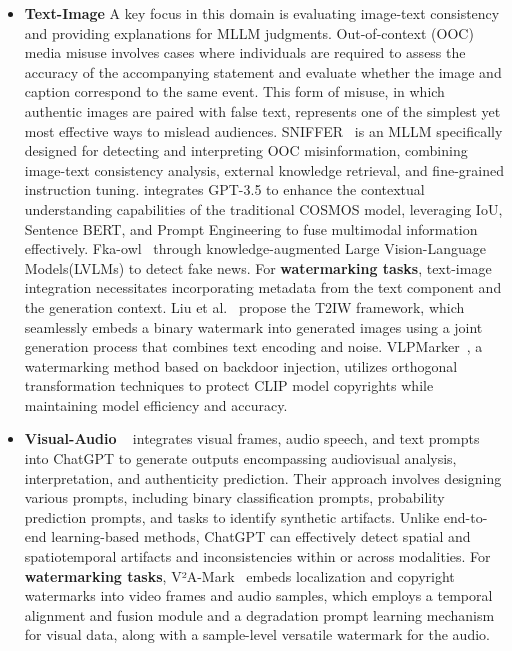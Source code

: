\begin{itemize}
    \item \textbf{Text-Image}
    A key focus in this domain is evaluating image-text consistency and providing explanations for MLLM judgments. Out-of-context (OOC) media misuse involves cases where individuals are required to assess the accuracy of the accompanying statement and evaluate whether the image and caption correspond to the same event. This form of misuse, in which authentic images are paired with false text, represents one of the simplest yet most effective ways to mislead audiences. SNIFFER~\cite{qi2024sniffer} is an MLLM specifically designed for detecting and interpreting OOC misinformation, combining image-text consistency analysis, external knowledge retrieval, and fine-grained instruction tuning. \cite{wu2023cheap} integrates GPT-3.5 to enhance the contextual understanding capabilities of the traditional COSMOS model, leveraging IoU, Sentence BERT, and Prompt Engineering to fuse multimodal information effectively. Fka-owl~\cite{liu2024fka} through knowledge-augmented Large Vision-Language Models(LVLMs) to detect fake news.
    For \textbf{watermarking tasks}, text-image integration necessitates incorporating metadata from the text component and the generation context. Liu et al.~\cite{liu2023t2iw} propose the T2IW framework, which seamlessly embeds a binary watermark into generated images using a joint generation process that combines text encoding and noise. VLPMarker~\cite{tang2023watermarking}, a watermarking method based on backdoor injection, utilizes orthogonal transformation techniques to protect CLIP model copyrights while maintaining model efficiency and accuracy.
    \item \textbf{Visual-Audio}
    ~\cite{shahzad2024good} integrates visual frames, audio speech, and text prompts into ChatGPT to generate outputs encompassing audiovisual analysis, interpretation, and authenticity prediction. Their approach involves designing various prompts, including binary classification prompts, probability prediction prompts, and tasks to identify synthetic artifacts. Unlike end-to-end learning-based methods, ChatGPT can effectively detect spatial and spatiotemporal artifacts and inconsistencies within or across modalities. For \textbf{watermarking tasks}, V²A-Mark~\cite{zhang2024v2a} embeds localization and copyright watermarks into video frames and audio samples, which employs a temporal alignment and fusion module and a degradation prompt learning mechanism for visual data, along with a sample-level versatile watermark for the audio. 
    
\end{itemize}
